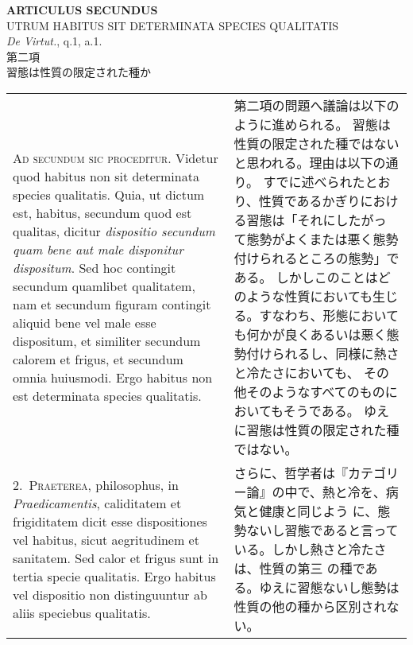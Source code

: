 \documentclass[10pt]{jsarticle} %
\begin{document}
\begin{center}
{\Large {\bf ARTICULUS SECUNDUS}}\\
{\large UTRUM HABITUS SIT DETERMINATA SPECIES QUALITATIS}\\
{\footnotesize {\itshape De Virtut.}, q.1, a.1.}\\
{\Large 第二項\\習態は性質の限定された種か}
\end{center}

\begin{longtable}{p{21em}p{21em}}

{\scshape Ad secundum sic proceditur}. Videtur quod habitus non sit determinata
species qualitatis. Quia, ut dictum est, habitus, secundum quod est
qualitas, dicitur {\itshape dispositio secundum quam bene aut male disponitur
dispositum}. Sed hoc contingit secundum quamlibet qualitatem, nam et
secundum figuram contingit aliquid bene vel male esse dispositum, et
similiter secundum calorem et frigus, et secundum omnia
huiusmodi. Ergo habitus non est determinata species qualitatis.

&

第二項の問題へ議論は以下のように進められる。
習態は性質の限定された種ではないと思われる。理由は以下の通り。
すでに述べられたとおり、性質であるかぎりにおける習態は「それにしたがっ
て態勢がよくまたは悪く態勢付けられるところの態勢」である。
しかしこのことはどのような性質においても生じる。すなわち、形態において
も何かが良くあるいは悪く態勢付けられるし、同様に熱さと冷たさにおいても、
その他そのようなすべてのものにおいてもそうである。
ゆえに習態は性質の限定された種ではない。



\\



2.~{\scshape Praeterea}, philosophus, in {\itshape Praedicamentis}, caliditatem et frigiditatem
dicit esse dispositiones vel habitus, sicut aegritudinem et
sanitatem. Sed calor et frigus sunt in tertia specie qualitatis. Ergo
habitus vel dispositio non distinguuntur ab aliis speciebus
qualitatis.

&

さらに、哲学者は『カテゴリー論』の中で、熱と冷を、病気と健康と同じよう
に、態勢ないし習態であると言っている。しかし熱さと冷たさは、性質の第三
の種である。ゆえに習態ないし態勢は性質の他の種から区別されない。

\\




\end{longtable}
\end{document}
